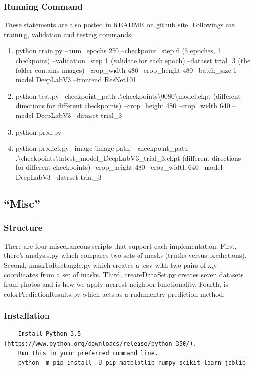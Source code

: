 \documentclass[10pt,journal,compsoc, draftclsnofoot,onecolumn]{IEEEtran}
\begin{document}
\subsubsection{Running Command}
These statements are also posted in README on github site. Followings are training, validation and testing commands:
\begin{enumerate}
\item python train.py --num\_epochs 250 --checkpoint\_step 6 (6 epoches, 1 checkpoint) --validation\_step 1 (validate for each epoch) --dataset trial\_3 (the folder contains images) --crop\_width 480 --crop\_height 480 --batch\_size 1 --model DeepLabV3 --frontend ResNet101
\item python test.py --checkpoint\_path .\textbackslash checkpoints\textbackslash0080\textbackslash model.ckpt (different directions for different checkpoints) --crop\_height 480 --crop\_width 640 --model DeepLabV3 --dataset trial\_3
\item python pred.py 
\item python predict.py --image 'image path' --checkpoint\_path .\textbackslash checkpoints\textbackslash latest\_model\_DeepLabV3\_trial\_3.ckpt (different directions for different checkpoints) --crop\_height 480 --crop\_width 640 --model DeepLabV3 --dataset trial\_3 
\end{enumerate}

\subsection{``Misc''}
\subsubsection{Structure}
There are four miscellaneous scripts that support each implementation.
First, there's analysis.py which compares two sets of masks (truths versus predictions).
Second, maskToRectangle.py which creates a .csv with two pairs of x,y coordinates from a set of masks.
Third, createDataSet.py creates seven datasets from photos and is how we apply nearest neighbor functionality.
Fourth, is colorPredictionResults.py which acts as a rudamentry prediction method.

\subsubsection{Installation}
\begin{verbatim}
    Install Python 3.5 (https://www.python.org/downloads/release/python-350/).
    Run this in your preferred command line.
    python -m pip install -U pip matplotlib numpy scikit-learn joblib
\end{verbatim}
\end{document}
